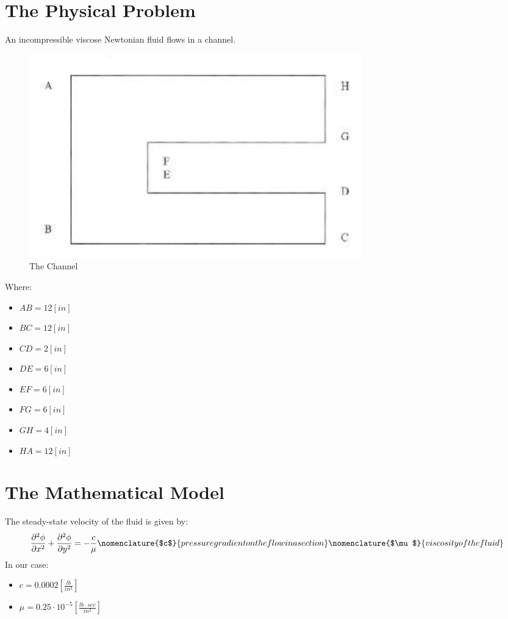 \documentclass[11pt, a4paper]{article}
\newcommand{\parder}[2]{\frac{\partial {#1}}{\partial {#2}}}
\begin{document}
\pagestyle{fancy}
\setcounter{page}{1}

\section{The Physical Problem}
An incompressible viscose Newtonian fluid flows in a channel.
\begin{figure}[H]
    \centering
    \includegraphics[width=0.7\textwidth]{images/The channel.png}
    \caption{The Channel}
    \label{fig: The Channel}
\end{figure}
Where:
\begin{multicols}{2}
    \begin{itemize}
        \item $AB=12\left[in\right]$
        \item $BC=12\left[in\right]$
        \item $CD=2\left[in\right]$
        \item $DE=6\left[in\right]$
        \item $EF=6\left[in\right]$
        \item $FG=6\left[in\right]$
        \item $GH=4\left[in\right]$
        \item $HA=12\left[in\right]$
    \end{itemize}
\end{multicols}

\section{The Mathematical Model}
The steady-state velocity of the fluid is given by:
\begin{equation}
    \parder{^2\phi}{x^2}+\parder{^2\phi}{y^2}=-\frac{c}{\mu}
    \nomenclature{$c$}{pressure gradient on the flow in a section}
    \nomenclature{$\mu$}{viscosity of the fluid}
\end{equation}
In our case:
\begin{itemize}
    \item $c=0.0002\left[\frac{lb}{in^3}\right]$
    \item $\mu=0.25\cdot10^{-5}\left[\frac{lb\cdot sec}{in^2}\right]$
\end{itemize}
\end{document}
